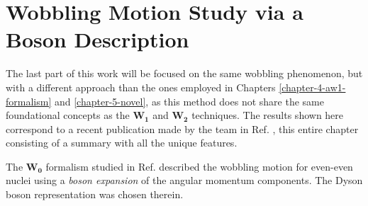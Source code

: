 \chapter{Wobbling Motion Study via a Boson Description}
\label{extra-chapter-new-boson}

The last part of this work will be focused on the same wobbling phenomenon, but with a different approach than the ones employed in Chapters \ref{chapter-4-aw1-formalism} and \ref{chapter-5-novel}, as this method does not share the same foundational concepts as the $\mathbf{W_1}$ and $\mathbf{W_2}$ techniques. The results shown here correspond to a recent publication made by the team in Ref. \cite{raduta2020new}, this entire chapter consisting of a summary with all the unique features.

The $\mathbf{W_0}$ formalism studied in Ref. \cite{raduta2017semiclassical} described the wobbling motion for even-even nuclei using a \emph{boson expansion} of the angular momentum components. The Dyson boson representation was chosen \cite{dyson1956general} therein.
